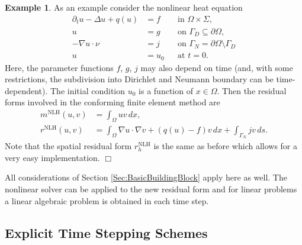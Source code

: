 \documentclass[a4paper,12pt]{article}
\theoremstyle{definition}
\newtheorem{exm}{Example}
\begin{document}
\begin{exm} \label{Exm:NonlinearHeatEquation}
As an example consider the nonlinear heat equation
\begin{align*}
\partial_t u -\Delta u + q(u) &= f &&\text{in $\Omega\times\Sigma$},\\
u &= g &&\text{on $\Gamma_D\subseteq\partial\Omega$},\\
-\nabla u\cdot \nu &= j &&\text{on $\Gamma_N=\partial\Omega\setminus\Gamma_D$}\\
u &= u_0 &&\text{at $t=0$}.
\end{align*}
Here, the parameter functions $f$, $g$, $j$ may also depend on time
(and, with some restrictions, the subdivision into Dirichlet and Neumann boundary
can be time-dependent). The initial
condition $u_0$ is a function of $x\in\Omega$. Then the residual forms 
involved in the conforming finite element method are
\begin{align*}
m^{\text{NLH}}(u,v) &= \int_\Omega u v \,dx, \\
r^{\text{NLH}}(u,v) &= \int_\Omega \nabla u \cdot \nabla v + (q(u)-f)v\,dx + \int_{\Gamma_N} jv\,ds .
\end{align*}
Note that the spatial residual form $r_h^{\text{NLH}}$ is the same as before
which allows for a very easy implementation. \hfill$\Box$
\end{exm}

All considerations of Section \ref{Sec:BasicBuildingBlock} apply here as well.
The nonlinear solver can be applied to the new residual form and for 
linear problems a linear algebraic problem is obtained in each time step.

\subsection*{Explicit Time Stepping Schemes}
\end{document}

